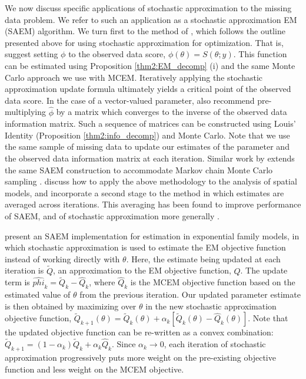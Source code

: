 \documentclass[11pt, oneside]{article}   	%
\begin{document}
We now discuss specific applications of stochastic approximation to the missing data problem. We refer to such an application as a stochastic approximation EM (SAEM) algorithm. We turn first to the method of \citet{Gu98I}, which follows the outline presented above for using stochastic approximation for optimization. That is, \citeauthor{Gu98I} suggest setting $\phi$ to the observed data score, $\phi(\theta) = S(\theta; y)$. This function can be estimated using Proposition \ref{thm2:EM_decomp} (i) and the same Monte Carlo approach we use with MCEM. Iteratively applying the stochastic approximation update formula ultimately yields a critical point of the observed data score. In the case of a vector-valued parameter, \citeauthor{Gu98I} also recommend pre-multiplying $\hat{\phi}$ by a matrix which converges to the inverse of the observed data information matrix. Such a sequence of matrices can be constructed using Louis' Identity (Proposition \ref{thm2:info_decomp}) and Monte Carlo. Note that we use the same sample of missing data to update our estimates of the parameter and the observed data information matrix at each iteration. Similar work by \citet{Gu98II} extends the same SAEM construction to accommodate Markov chain Monte Carlo sampling \citep[see also][]{Cai10}. \citet{Gu01} discuss how to apply the above methodology to the analysis of spatial models, and incorporate a second stage to the method in which estimates are averaged across iterations. This averaging has been found to improve performance of SAEM, and of stochastic approximation more generally \citep{Pol92, Del99}.

\citet{Dey99} present an SAEM implementation for estimation in exponential family models, in which stochastic approximation is used to estimate the EM objective function instead of working directly with $\theta$. Here, the estimate being updated at each iteration is $\tilde{Q}$, an approximation to the EM objective function, $Q$. The update term is $\hat{phi}_k = \tilde{Q}_k - \hat{Q}_k$, where $\hat{Q}_k$ is the MCEM objective function based on the estimated value of $\theta$ from the previous iteration. Our updated parameter estimate is then obtained by maximizing over $\theta$ in the new stochastic approximation objective function, $\tilde{Q}_{k+1}(\theta) = \tilde{Q}_k(\theta) + \alpha_k [ \tilde{Q}_k(\theta) - \hat{Q}_k(\theta)]$. Note that the updated objective function can be re-written as a convex combination: $\tilde{Q}_{k+1} = (1 - \alpha_k) \tilde{Q}_k + \alpha_k \hat{Q}_k$. Since $\alpha_k \rightarrow 0$, each iteration of stochastic approximation progressively puts more weight on the pre-existing objective function and less weight on the MCEM objective.
\end{document}
